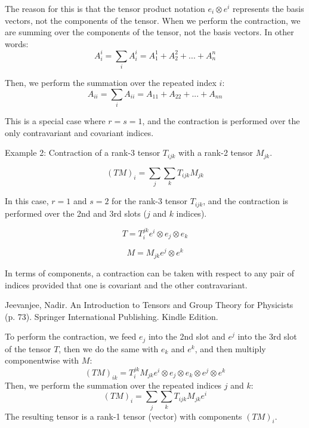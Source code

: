 The reason for this is that the tensor product notation $e_i \otimes e^i$
represents the basis vectors, not the components of the tensor.
When we perform the contraction, we are summing over the components of the tensor, not the basis vectors.
In other words:
$$
A^i_i = \sum_i A^i_i = A^1_1 + A^2_2 + ... + A^n_n
$$

Then, we perform the summation over the repeated index $i$:
$$
A_{ii} = \sum_i A_{ii} = A_{11} + A_{22} + ... + A_{nn}
$$

This is a special case where $r = s = 1$,
and the contraction is performed over the only contravariant and covariant indices.



Example 2: Contraction of a rank-3 tensor $T_{ijk}$ with a rank-2 tensor $M_{jk}$.

$$
(TM)_i = \sum_j \sum_k T_{ijk} M_{jk}
$$

In this case, $r = 1$ and $s = 2$ for the rank-3 tensor $T_{ijk}$,
and the contraction is performed over the 2nd and 3rd slots ($j$ and $k$ indices).

$$
T = T_{i}^{jk} e^i \otimes e_j \otimes e_k
$$

$$
M = M_{jk} e^j \otimes e^k
$$

In terms of components, a  contraction can be taken with respect to any pair of indices
provided that one is  covariant and the other contravariant.

Jeevanjee, Nadir. An Introduction to Tensors and Group Theory for Physicists (p. 73). Springer International Publishing. Kindle Edition. 

To perform the contraction, we feed $e_j$ into the 2nd slot and $e^j$ into the 3rd slot of the tensor $T$,
then we do the same with $e_k$ and $e^k$,
and then multiply componentwise with $M$:
$$
(TM)_{ik} = T_{i}^{jk} M_{jk} e^i \otimes e_j \otimes e_k \otimes e^j \otimes e^k
$$
Then, we perform the summation over the repeated indices $j$ and $k$:
$$
(TM)_i = \sum_j \sum_k T_{ijk} M_{jk} e^i
$$
The resulting tensor is a rank-1 tensor (vector) with components $(TM)_i$.

